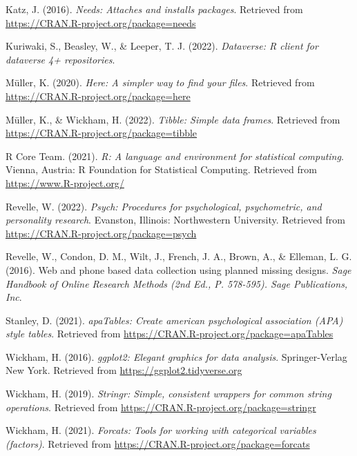 \documentclass[
  english,
  man]{apa6}
\newlength{\cslhangindent}
\newlength{\cslentryspacingunit} %
\newenvironment{CSLReferences}[2] %
 {%
  \setlength{\parindent}{0pt}
  \ifodd #1
  \let\oldpar\par
  \def\par{\hangindent=\cslhangindent\oldpar}
  \fi
  \setlength{\parskip}{#2\cslentryspacingunit}
 }%
 {}
\begin{document}
\begin{CSLReferences}{1}{0}
\leavevmode{}%
Katz, J. (2016). \emph{Needs: Attaches and installs packages}. Retrieved from \url{https://CRAN.R-project.org/package=needs}

\leavevmode{}%
Kuriwaki, S., Beasley, W., \& Leeper, T. J. (2022). \emph{Dataverse: R client for dataverse 4+ repositories}.

\leavevmode{}%
Müller, K. (2020). \emph{Here: A simpler way to find your files}. Retrieved from \url{https://CRAN.R-project.org/package=here}

\leavevmode{}%
Müller, K., \& Wickham, H. (2022). \emph{Tibble: Simple data frames}. Retrieved from \url{https://CRAN.R-project.org/package=tibble}

\leavevmode{}%
R Core Team. (2021). \emph{R: A language and environment for statistical computing}. Vienna, Austria: R Foundation for Statistical Computing. Retrieved from \url{https://www.R-project.org/}

\leavevmode{}%
Revelle, W. (2022). \emph{Psych: Procedures for psychological, psychometric, and personality research}. Evanston, Illinois: Northwestern University. Retrieved from \url{https://CRAN.R-project.org/package=psych}

\leavevmode{}%
Revelle, W., Condon, D. M., Wilt, J., French, J. A., Brown, A., \& Elleman, L. G. (2016). Web and phone based data collection using planned missing designs. \emph{Sage Handbook of Online Research Methods (2nd Ed., P. 578-595). Sage Publications, Inc}.

\leavevmode{}%
Stanley, D. (2021). \emph{apaTables: Create american psychological association (APA) style tables}. Retrieved from \url{https://CRAN.R-project.org/package=apaTables}

\leavevmode{}%
Wickham, H. (2016). \emph{ggplot2: Elegant graphics for data analysis}. Springer-Verlag New York. Retrieved from \url{https://ggplot2.tidyverse.org}

\leavevmode{}%
Wickham, H. (2019). \emph{Stringr: Simple, consistent wrappers for common string operations}. Retrieved from \url{https://CRAN.R-project.org/package=stringr}

\leavevmode{}%
Wickham, H. (2021). \emph{Forcats: Tools for working with categorical variables (factors)}. Retrieved from \url{https://CRAN.R-project.org/package=forcats}


\end{CSLReferences}
\end{document}
